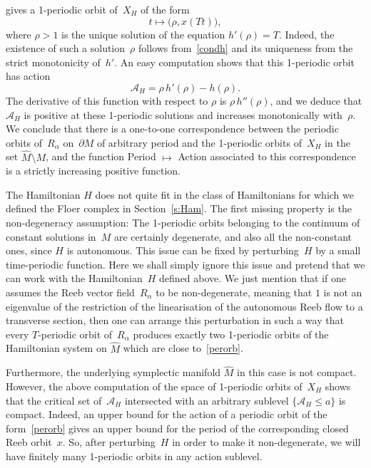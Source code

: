 \documentclass[12pt,twoside]{amsart}
\theoremstyle{plain}
\numberwithin{figure}{section}
\numberwithin{equation}{section}
\def\ca{{\mathcal A}}
\begin{document}
gives a 1-periodic orbit of~$X_H$ of the form
\begin{equation}
\label{perorb}
t \mapsto \bigl(\rho,x(Tt) \bigr),
\end{equation}
where $\rho>1$ is the unique solution of the equation $h'(\rho)=T$. Indeed, the existence of such a solution~$\rho$ follows from~\eqref{condh} and its uniqueness from the strict monotonicity 
of~$h'$. An easy computation shows that this 1-periodic orbit has action
\[
\ca_H = \rho \, h'(\rho) - h(\rho).
\]
The derivative of this function with respect to $\rho$ is $\rho \, h''(\rho)$, 
and we deduce that $\ca_H$ is positive at these 1-periodic solutions and increases monotonically with~$\rho$. We conclude that there is a one-to-one correspondence between the periodic orbits 
of~$R_{\alpha}$ on~$\partial M$ of arbitrary period and the 1-periodic orbits of~$X_H$ 
in the set $\widehat{M} \setminus M$, and the function Period $\mapsto$ Action associated to this correspondence is a strictly increasing positive function.

The Hamiltonian $H$ does not quite fit in the class of Hamiltonians for which we defined the Floer complex in Section~\ref{s:Ham}. The first missing property is the non-degeneracy assumption: The 1-periodic orbits belonging to the continuum of constant solutions in~$M$ are certainly degenerate, and also all the non-constant ones, since $H$ is autonomous. 
This issue can be fixed by perturbing~$H$ by a small time-periodic function. Here we shall simply ignore this issue and pretend that we can work with the Hamiltonian~$H$ defined above. We just mention that if one assumes the Reeb vector field~$R_{\alpha}$ to be non-degenerate, 
meaning that $1$ is not an eigenvalue of the restriction of the linearisation of the autonomous Reeb flow to a transverse section, then one can arrange this perturbation in such a way that every $T$-periodic orbit of~$R_{\alpha}$ produces exactly two 1-periodic orbits of the Hamiltonian system on $\widehat{M}$ which are close to~\eqref{perorb}.

Furthermore, the underlying symplectic manifold $\widehat{M}$ in this case is not compact. 
However, the above computation of the space of 1-periodic orbits of~$X_H$ shows that the critical set 
of~$\ca_H$ intersected with an arbitrary sublevel $\{\ca_H \leqslant a\}$ is compact. 
Indeed, an upper bound for the action of a periodic orbit of the form~\eqref{perorb} 
gives an upper bound for the period of the corresponding closed Reeb orbit~$x$. 
So, after perturbing~$H$ in order to make it non-degenerate, we will have finitely many 
1-periodic orbits in any action sublevel.
\end{document}
